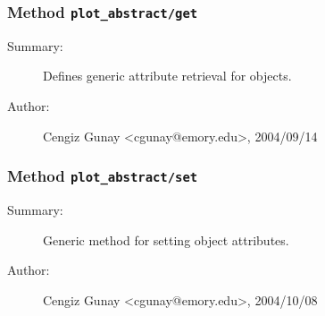 \subsubsection[Method \texttt{get}]{Method \texttt{plot\_abstract/get}}%
%
\label{ref_plot_abstract__get}%
\hypertarget{ref_plot_abstract__get}{}%
\begin{description}
\item[Summary:]Defines generic attribute retrieval for objects.
%
%
%
%
%
%
%
\item[Author:]%
Cengiz Gunay <cgunay@emory.edu>, 2004/09/14%
\end{description}
\methodline%
\subsubsection[Method \texttt{set}]{Method \texttt{plot\_abstract/set}}%
%
\label{ref_plot_abstract__set}%
\hypertarget{ref_plot_abstract__set}{}%
\begin{description}
\item[Summary:]Generic method for setting object attributes.
%
%
%
%
%
%
%
\item[Author:]%
Cengiz Gunay <cgunay@emory.edu>, 2004/10/08%
\end{description}
\methodline%
